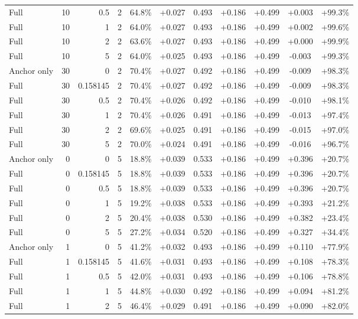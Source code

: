 \begin{table}[htbp]
\begin{tabular}{lrrrccccccc}
Full & 10 & 0.5 & 2 & 64.8\% & +0.027 & 0.493 & +0.186 & +0.499 & +0.003 & +99.3\% \\
Full & 10 & 1 & 2 & 64.0\% & +0.027 & 0.493 & +0.186 & +0.499 & +0.002 & +99.6\% \\
Full & 10 & 2 & 2 & 63.6\% & +0.027 & 0.493 & +0.186 & +0.499 & +0.000 & +99.9\% \\
Full & 10 & 5 & 2 & 64.0\% & +0.025 & 0.493 & +0.186 & +0.499 & -0.003 & +99.3\% \\
Anchor only & 30 & 0 & 2 & 70.4\% & +0.027 & 0.492 & +0.186 & +0.499 & -0.009 & +98.3\% \\
Full & 30 & 0.158145 & 2 & 70.4\% & +0.027 & 0.492 & +0.186 & +0.499 & -0.009 & +98.3\% \\
Full & 30 & 0.5 & 2 & 70.4\% & +0.026 & 0.492 & +0.186 & +0.499 & -0.010 & +98.1\% \\
Full & 30 & 1 & 2 & 70.4\% & +0.026 & 0.491 & +0.186 & +0.499 & -0.013 & +97.4\% \\
Full & 30 & 2 & 2 & 69.6\% & +0.025 & 0.491 & +0.186 & +0.499 & -0.015 & +97.0\% \\
Full & 30 & 5 & 2 & 70.0\% & +0.024 & 0.491 & +0.186 & +0.499 & -0.016 & +96.7\% \\
Anchor only & 0 & 0 & 5 & 18.8\% & +0.039 & 0.533 & +0.186 & +0.499 & +0.396 & +20.7\% \\
Full & 0 & 0.158145 & 5 & 18.8\% & +0.039 & 0.533 & +0.186 & +0.499 & +0.396 & +20.7\% \\
Full & 0 & 0.5 & 5 & 18.8\% & +0.039 & 0.533 & +0.186 & +0.499 & +0.396 & +20.7\% \\
Full & 0 & 1 & 5 & 19.2\% & +0.038 & 0.533 & +0.186 & +0.499 & +0.393 & +21.2\% \\
Full & 0 & 2 & 5 & 20.4\% & +0.038 & 0.530 & +0.186 & +0.499 & +0.382 & +23.4\% \\
Full & 0 & 5 & 5 & 27.2\% & +0.034 & 0.520 & +0.186 & +0.499 & +0.327 & +34.4\% \\
Anchor only & 1 & 0 & 5 & 41.2\% & +0.032 & 0.493 & +0.186 & +0.499 & +0.110 & +77.9\% \\
Full & 1 & 0.158145 & 5 & 41.6\% & +0.031 & 0.493 & +0.186 & +0.499 & +0.108 & +78.3\% \\
Full & 1 & 0.5 & 5 & 42.0\% & +0.031 & 0.493 & +0.186 & +0.499 & +0.106 & +78.8\% \\
Full & 1 & 1 & 5 & 44.8\% & +0.030 & 0.492 & +0.186 & +0.499 & +0.094 & +81.2\% \\
Full & 1 & 2 & 5 & 46.4\% & +0.029 & 0.491 & +0.186 & +0.499 & +0.090 & +82.0\% \\

\end{tabular}
\end{table}
